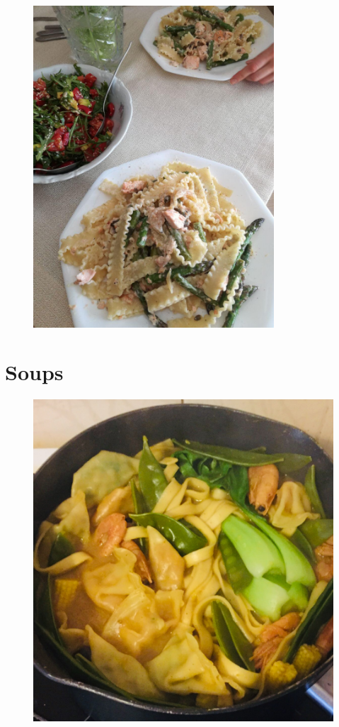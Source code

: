 \documentclass[%
titlepage,
b5paper,
twoside,
11pt
]{book}
\begin{document}
\begin{figure}[h]
	\centering
	\includegraphics[height=12cm,angle=0]{pic/lunch2}
\end{figure}


\newpage

\newpage

\newpage

\newpage

\newpage

\newpage

\newpage

\chapter{Soups}
\begin{figure}[h]
	\centering
	\includegraphics[height=12cm]{pic/soup}
\end{figure}
\end{document}
